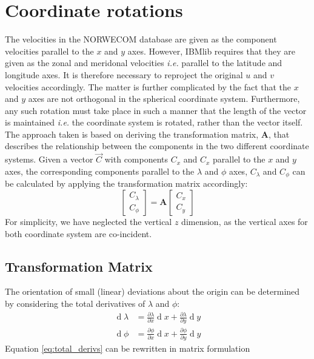 \documentclass[a4paper,10pt]{article}
\begin{document}
\section{Coordinate rotations}
The velocities in the NORWECOM database are given as the component velocities parallel to the $x$ and $y$ axes. However, IBMlib requires that they are given as the zonal and meridonal velocities \textit{i.e.} parallel to the latitude and longitude axes. It is therefore necessary to reproject the original $u$ and $v$ velocities accordingly. The matter is further complicated by the fact that the $x$ and $y$ axes are not orthogonal in the spherical coordinate system. Furthermore, any such rotation must take place in such a manner that the length of the vector is maintained \textit{i.e.} the coordinate system is rotated, rather than the vector itself. The approach taken is based on deriving the transformation matrix, $\mathbf{A}$, that describes the relationship between the components in the two different coordinate systems. Given a vector $\vec C$ with components $C_x$ and $C_x$ parallel to the $x$ and $y$ axes, the corresponding components parallel to the $\lambda$ and $\phi$ axes, $C_\lambda$ and $C_\phi$ can be calculated by applying the transformation matrix accordingly:
\begin{equation}\label{eq:transformation_relation}
   \left[\begin{matrix}
    C_\lambda \\ C_\phi
   \end{matrix}\right]
  = \mathbf{A}
   \left[\begin{matrix}
    C_x \\ C_y
   \end{matrix}\right]
\end{equation} 
For simplicity, we have neglected the vertical $z$ dimension, as the vertical axes for both coordinate system are co-incident. 

\subsection{Transformation Matrix}
The orientation of small (linear) deviations about the origin can be determined by considering the total derivatives of $\lambda$ and $\phi$:
\begin{equation}\label{eq:total_derivs}\begin{aligned}
  \operatorname d \lambda &= \frac{\partial \lambda}{\partial x} \operatorname d x + \frac{\partial \lambda}{\partial y} \operatorname d y  \\
  \operatorname d \phi &= \frac{\partial \phi}{\partial x} \operatorname d x + \frac{\partial \phi}{\partial y} \operatorname d y
\end{aligned}\end{equation} 
Equation \eqref{eq:total_derivs} can be rewritten in matrix formulation
\end{document}
